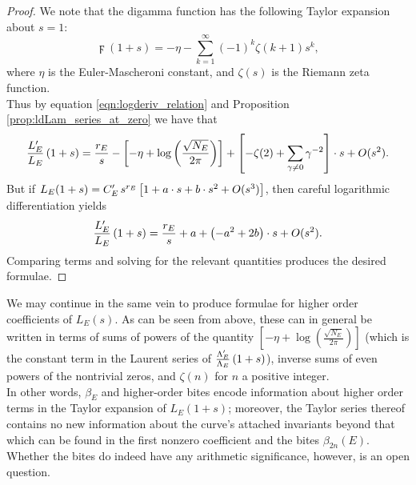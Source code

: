 \begin{proof}
We note that the digamma function has the following Taylor expansion about $s=1$:
\begin{equation}
\digamma(1+s) = -\eta - \sum_{k=1}^{\infty} (-1)^k \zeta(k+1) s^k,
\end{equation}
where $\eta$ is the Euler-Mascheroni constant, and $\zeta(s)$ is the Riemann zeta function. \\
Thus by equation \ref{eqn:logderiv_relation} and Proposition \ref{prop:ldLam_series_at_zero} we have that
\begin{equation*}
\frac{L_E^{\prime}}{L_E}\left(1+s\right) = \frac{r_E}{s} - \left[-\eta + \log\left(\frac{\sqrt{N_E}}{2\pi}\right)\right] + \left[-\zeta(2) + \sum_{\gamma\ne0} \gamma^{-2}\right]\cdot s + O(s^2).
\end{equation*}
But if $L_E(1+s) = C_E^{\prime} \, s^{r_E}\left[1 + a\cdot s + b\cdot s^2 + O(s^3)\right]$, then careful logarithmic differentiation yields
\begin{equation*}
\frac{L_E^{\prime}}{L_E}\left(1+s\right) = \frac{r_E}{s} + a + \left(-a^2 + 2b\right)\cdot s + O(s^2).
\end{equation*}
Comparing terms and solving for the relevant quantities produces the desired formulae.
\end{proof}
We may continue in the same vein to produce formulae for higher order coefficients of $L_E(s)$. As can be seen from above, these can in general be written in terms of sums of powers of the quantity $\left[-\eta + \log\left(\frac{\sqrt{N_E}}{2\pi}\right)\right]$ (which is the constant term in the Laurent series of $\frac{\Lambda_E^{\prime}}{\Lambda_E}\left(1+s\right)$), inverse sums of even powers of the nontrivial zeros, and $\zeta(n)$ for $n$ a positive integer. \\

In other words, $\beta_E$ and higher-order bites encode information about higher order terms in the Taylor expansion of $L_E(1+s)$; moreover, the Taylor series thereof contains no new information about the curve's attached invariants beyond that which can be found in the first nonzero coefficient and the bites $\beta_{2n}(E)$. Whether the bites do indeed have any arithmetic significance, however, is an open question. \\

